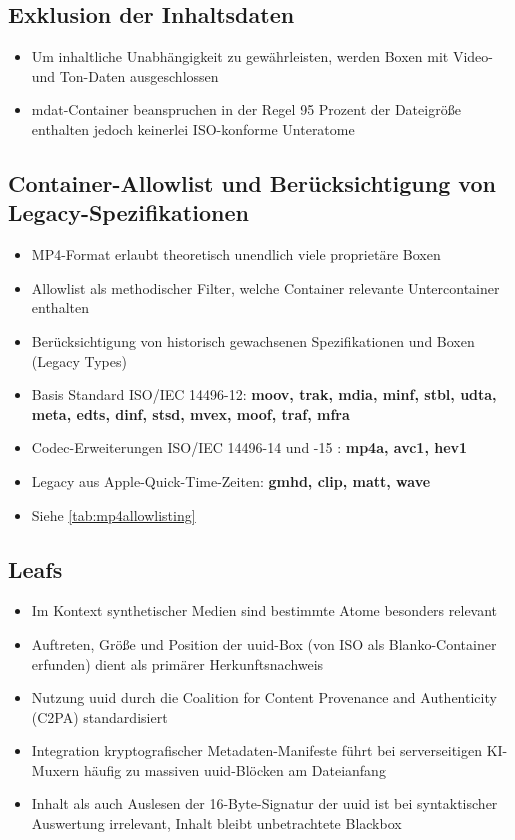 \subsection{Exklusion der Inhaltsdaten}
\begin{itemize}
    \item Um inhaltliche Unabhängigkeit zu gewährleisten, werden Boxen mit Video- und Ton-Daten ausgeschlossen
    \item mdat-Container beanspruchen in der Regel 95 Prozent der Dateigröße enthalten jedoch keinerlei ISO-konforme Unteratome
\end{itemize}


\subsection{Container-Allowlist und Berücksichtigung von Legacy-Spezifikationen}

\begin{itemize}
    \item MP4-Format erlaubt theoretisch unendlich viele proprietäre Boxen
    \item Allowlist als methodischer Filter, welche Container relevante Untercontainer enthalten
    \item Berücksichtigung von historisch gewachsenen Spezifikationen und Boxen (Legacy Types) 
    \item Basis Standard ISO/IEC 14496-12: \textbf{moov, trak, mdia, minf, stbl, udta, meta, edts, dinf, stsd, mvex, moof, traf, mfra} \cite{iso_14496-12_2022}
    \item Codec-Erweiterungen ISO/IEC 14496-14 und -15 : \textbf{mp4a, avc1, hev1} \cite{iso_14496-14_2020}\cite{iso_14496-15_2024}
    \item Legacy aus Apple-Quick-Time-Zeiten: \textbf{gmhd, clip, matt, wave}\cite{apple_quicktime_2001}
    \item Siehe \cref{tab:mp4allowlisting}
\end{itemize}



\subsection{Leafs}
\begin{itemize}
    \item Im Kontext synthetischer Medien sind bestimmte Atome besonders relevant
    \item Auftreten, Größe und Position der uuid-Box (von ISO als Blanko-Container erfunden) dient als primärer Herkunftsnachweis 
    \item Nutzung uuid durch die Coalition for Content Provenance and Authenticity (C2PA) standardisiert 
    \item Integration kryptografischer Metadaten-Manifeste führt bei serverseitigen KI-Muxern häufig zu massiven uuid-Blöcken am Dateianfang 
    \item Inhalt als auch Auslesen der 16-Byte-Signatur der uuid ist bei syntaktischer Auswertung irrelevant, Inhalt bleibt unbetrachtete Blackbox
\end{itemize}

